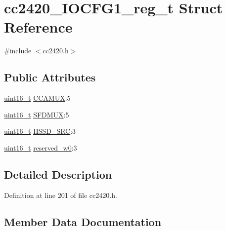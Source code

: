 \hypertarget{structcc2420___i_o_c_f_g1__reg__t}{}\section{cc2420\+\_\+\+I\+O\+C\+F\+G1\+\_\+reg\+\_\+t Struct Reference}
\label{structcc2420___i_o_c_f_g1__reg__t}


{\ttfamily \#include $<$cc2420.\+h$>$}

\subsection*{Public Attributes}
\begin{DoxyCompactItemize}
\item 
\hyperlink{_p_e___types_8h_a1f1825b69244eb3ad2c7165ddc99c956}{uint16\+\_\+t} \hyperlink{structcc2420___i_o_c_f_g1__reg__t_abc4fff627c0baa630cdf08a090f38706}{C\+C\+A\+M\+UX}\+:5
\item 
\hyperlink{_p_e___types_8h_a1f1825b69244eb3ad2c7165ddc99c956}{uint16\+\_\+t} \hyperlink{structcc2420___i_o_c_f_g1__reg__t_a946e207eb60763f780e34cc91569941c}{S\+F\+D\+M\+UX}\+:5
\item 
\hyperlink{_p_e___types_8h_a1f1825b69244eb3ad2c7165ddc99c956}{uint16\+\_\+t} \hyperlink{structcc2420___i_o_c_f_g1__reg__t_ae0a0828c83ff333c1762ba3a9d3715cf}{H\+S\+S\+D\+\_\+\+S\+RC}\+:3
\item 
\hyperlink{_p_e___types_8h_a1f1825b69244eb3ad2c7165ddc99c956}{uint16\+\_\+t} \hyperlink{structcc2420___i_o_c_f_g1__reg__t_a0b03ea604ca3123fbcf1a7c70da47e11}{reserved\+\_\+w0}\+:3
\end{DoxyCompactItemize}


\subsection{Detailed Description}


Definition at line 201 of file cc2420.\+h.



\subsection{Member Data Documentation}

